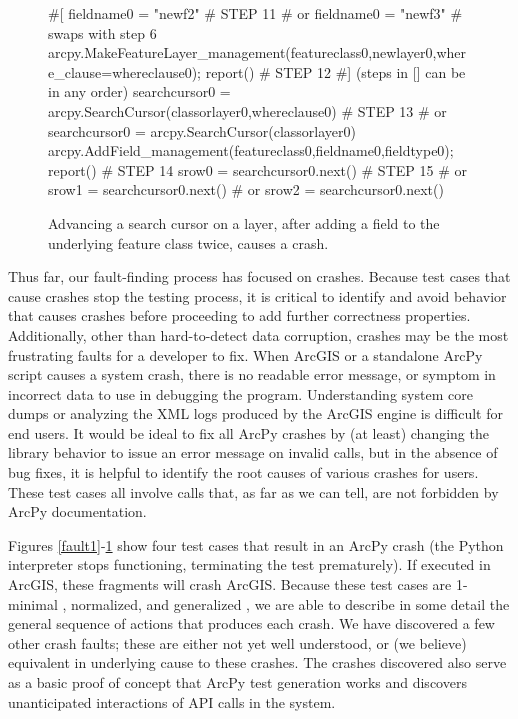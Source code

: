 \begin{figure}
{\begin{code}
\textcolor{black!60}{\#[}
fieldname0 = "newf2"                                                       \textcolor{black!60}{\# STEP 11}
\textcolor{black!60}{\#  or fieldname0 = "newf3" }
\textcolor{black!60}{\#  swaps with step 6}
arcpy.MakeFeatureLayer\_management(featureclass0,newlayer0,where\_clause=whereclause0);
   report()                                                                \textcolor{black!60}{\# STEP 12}
\textcolor{black!60}{\#] (steps in [] can be in any order)}
searchcursor0 = arcpy.SearchCursor(classorlayer0,whereclause0)             \textcolor{black!60}{\# STEP 13}
\textcolor{black!60}{\#  or searchcursor0 = arcpy.SearchCursor(classorlayer0) }
arcpy.AddField\_management(featureclass0,fieldname0,fieldtype0); report()   \textcolor{black!60}{\# STEP 14}
srow0 = searchcursor0.next()                                               \textcolor{black!60}{\# STEP 15}
\textcolor{black!60}{\#  or srow1 = searchcursor0.next() }
\textcolor{black!60}{\#  or srow2 = searchcursor0.next()}
\end{code}
}
\caption{Advancing a search cursor on a layer, after adding a field to
  the underlying feature class twice, causes a crash.}
\label{fault4}
\end{figure}

Thus far, our fault-finding process has focused on crashes.  Because
test cases that cause crashes stop the testing process, it is critical
to identify and avoid behavior that causes crashes before proceeding
to add further correctness properties.  Additionally, other than
hard-to-detect data corruption, crashes may be the most frustrating
faults for a developer to fix.  When ArcGIS or a standalone ArcPy
script causes a system crash, there is no readable error message, or
symptom in incorrect data to use in debugging the program.
Understanding system core dumps or analyzing the XML logs produced by
the ArcGIS engine is difficult for end users.  It would be ideal to
fix all ArcPy crashes by (at least) changing the library behavior to
issue an error message on invalid calls, but in the absence of bug
fixes, it is helpful to identify the root causes of various crashes
for users.  These test cases all involve calls that, as far as we
can tell, are not forbidden by ArcPy documentation.

Figures \ref{fault1}-\ref{fault4} show four test cases that result in
an ArcPy crash (the Python interpreter stops functioning, terminating
the test prematurely).  If executed in ArcGIS, these fragments will
crash ArcGIS.  Because these test cases are 1-minimal \cite{DD},
normalized, and generalized \cite{ICSTnorm}, we are able to describe in some detail
the general sequence of actions that produces each crash.  We have
discovered a few other crash faults; these are either not yet
well understood, or (we believe) equivalent in underlying cause
to these crashes.  The crashes discovered also serve as a basic proof
of concept that ArcPy test generation works and discovers
unanticipated interactions of API calls in the system.

